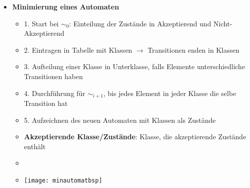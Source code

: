 \begin{itemize}
		
\item {\large \textbf{Minimierung eines Automaten}}
	\begin{itemize}
	\item 1. Start bei $\sim_0$: Einteilung der Zustände in Akzeptierend und Nicht-Akzeptierend
	\item 2. Eintragen in Tabelle mit Klassen $\rightarrow$ Transitionen enden in Klassen
	\item 3. Aufteilung einer Klasse in Unterklasse, falls Elemente unterschiedliche Transitionen haben
	\item 4. Durchführung für $\sim_{i+1}$, bis jedes Element in jeder Klasse die selbe Transition hat
	\item 5. Aufzeichnen des neuen Automaten mit Klassen als Zustände
	\item \textbf{Akzeptierende Klasse/Zustände}: Klasse, die akzeptierende Zustände enthält
	\item[]
	\item[]
		\begin{center}
		\texttt{[image: minautomatbsp]}
		\end{center}
	\end{itemize}			

\pagebreak



\end{itemize}
